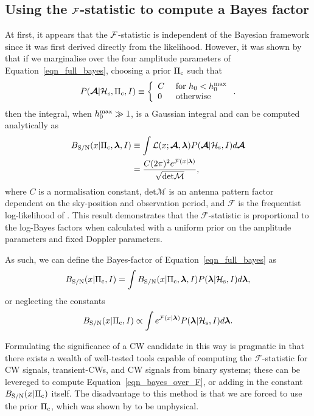 \documentclass[aps, prd, twocolumn, superscriptaddress, floatfix, showpacs, nofootinbib, longbibliography]{revtex4-1}
\begin{document}
\subsection{Using the ${\mathcal{F}}$-statistic to compute a Bayes factor} At first, it
appears that the ${\mathcal{F}}$-statistic is independent of the Bayesian framework since
it was first derived directly from the likelihood. However, it was shown by
\citet{prix2009} that if we marginalise over the four amplitude parameters of
Equation~\eqref{eqn_full_bayes}, choosing a prior $\Pi_{\rm c}$ such that
\begin{equation}
P(\boldsymbol{\mathcal{A}}| \mathcal{H}_{\rm s}, \Pi_{\rm c}, I) \equiv \left\{
\begin{array}{ll}
C & \textrm{ for } h_0 < h_0^{\rm max} \\
0 & \textrm{ otherwise}
\end{array}
\right..
\end{equation}
then the integral, when $h_0^{\rm max} \gg 1$, is a Gaussian integral and can be
computed analytically as
\begin{align}
B_{\rm S/N}(x| \Pi_{\rm c}, \boldsymbol{\mathbf{\lambda}}, I) & \equiv
\int
\mathcal{L}(x ;\boldsymbol{\mathcal{A}}, \boldsymbol{\mathbf{\lambda}})
P(\boldsymbol{\mathcal{A}}| \mathcal{H}_{\rm s}, I) d\boldsymbol{\mathcal{A}}
\\
& = \frac{C (2\pi)^{2} e^{{\mathcal{F}}(x| \boldsymbol{\mathbf{\lambda}})}}
{\sqrt{\textrm{det} \mathcal{M}}},
\end{align}
where $C$ is a normalisation constant, $\textrm{det}\mathcal{M}$ is an antenna
pattern factor dependent on the sky-position and observation period, and
$\mathcal{F}$ is the frequentist log-likelihood of \citet{jks1998}. This result
demonstrates that the $\mathcal{F}$-statistic is proportional to the log-Bayes
factors when calculated with a uniform prior on the amplitude parameters and
fixed Doppler parameters.

As such, we can define the Bayes-factor of Equation~\eqref{eqn_full_bayes} as
\begin{equation}
B_{\rm S/N}(x| \Pi_{\rm c}, I) = \int
B_{\rm S/N}(x| \Pi_{\rm c}, \boldsymbol{\mathbf{\lambda}}, I) P(\boldsymbol{\mathbf{\lambda}}| \mathcal{H}_{\rm s}, I)
 d\boldsymbol{\mathbf{\lambda}},
\end{equation}
or neglecting the constants
\begin{equation}
B_{\rm S/N}(x| \Pi_{\rm c}, I) \propto \int
e^{{\mathcal{F}}(x| \boldsymbol{\mathbf{\lambda}})} P(\boldsymbol{\mathbf{\lambda}}| \mathcal{H}_{\rm s}, I)
 d\boldsymbol{\mathbf{\lambda}}.
\label{eqn_bayes_over_F}
\end{equation}

Formulating the significance of a CW candidate in this way is pragmatic in that
there exists a wealth of well-tested tools \citep{lalsuite} capable of
computing the $\mathcal{F}$-statistic for CW signals, transient-CWs, and CW
signals from binary systems; these can be levereged to compute
Equation~\eqref{eqn_bayes_over_F}, or adding in the constant
$B_{\rm S/N}(x| \Pi_{\rm c})$ itself. The disadvantage to this method is that
we are forced to use the prior $\Pi_{\rm c}$, which was shown by \citet{prix2009} to
be unphysical.
\end{document}
